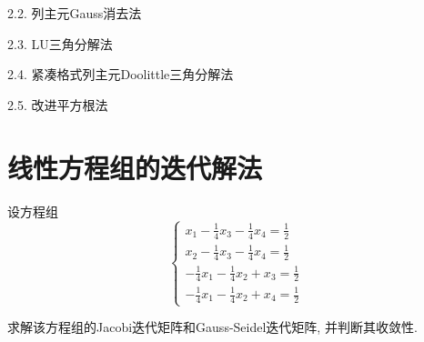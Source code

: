 2.2. 列主元Gauss消去法

2.3. LU三角分解法

2.4. 紧凑格式列主元Doolittle三角分解法

2.5. 改进平方根法

\section*{线性方程组的迭代解法}

设方程组
\begin{equation*}
    \begin{cases}
        x_1-\frac{1}{4}x_3-\frac{1}{4}x_4=\frac{1}{2}\\
        x_2-\frac{1}{4}x_3-\frac{1}{4}x_4=\frac{1}{2}\\
        -\frac{1}{4}x_1-\frac{1}{4}x_2+x_3=\frac{1}{2}\\
        -\frac{1}{4}x_1-\frac{1}{4}x_2+x_4=\frac{1}{2}
    \end{cases}
\end{equation*}

求解该方程组的Jacobi迭代矩阵和Gauss-Seidel迭代矩阵, 并判断其收敛性.